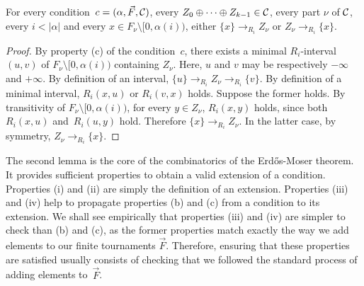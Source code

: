 \begin{lemma}\label{lem:em-comp-reduc-uniform-behaviour}
For every condition~$c = (\alpha, \vec{F}, \mathcal{C})$,
every $Z_0 \oplus \dots \oplus Z_{k-1} \in \mathcal{C}$, 
every part $\nu$ of $\mathcal{C}$, every $i < |\alpha|$ and every $x \in F_\nu \setminus [0, \alpha(i))$, 
either $\{x\} \to_{R_i} Z_\nu$ or $Z_\nu \to_{R_i} \{x\}$.
\end{lemma}
\begin{proof}
By property (c) of the condition~$c$, there exists a minimal $R_i$-interval
$(u, v)$ of $F_\nu \setminus [0, \alpha(i))$ containing $Z_\nu$.
Here, $u$ and $v$ may be respectively $-\infty$ and $+\infty$.
By definition of an interval, $\{u\} \to_{R_i} Z_\nu \to_{R_i} \{v\}$.
By definition of a minimal interval, $R_i(x, u)$ or $R_i(v, x)$ holds.
Suppose the former holds. By transitivity of $F_\nu \setminus [0, \alpha(i))$,
for every $y \in Z_\nu$, $R_i(x, y)$ holds, since both $R_i(x, u)$ and~$R_i(u, y)$ hold. 
Therefore $\{x\} \to_{R_i} Z_\nu$. In the latter case, by symmetry, $Z_\nu \to_{R_i} \{x\}$.
\end{proof}

The second lemma is the core of the combinatorics of the Erd\H{o}s-Moser theorem. It provides
sufficient properties to obtain a valid extension of a condition. Properties (i) and (ii)
are simply the definition of an extension. Properties (iii) and (iv) help to propagate
properties (b) and (c) from a condition to its extension. We shall see empirically that 
properties (iii) and (iv) are simpler to check than (b) and (c), 
as the former properties match exactly the way we add elements to our finite tournaments $\vec{F}$. 
Therefore, ensuring that these properties
are satisfied usually consists of checking that we followed the standard process of adding elements
to~$\vec{F}$. 


